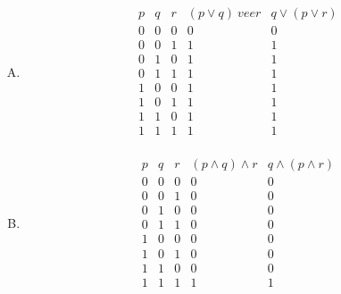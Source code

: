 {{        %
        \begin{practices}
            \begin{enumerate}[A.]
                \item
                {
                    \begin{table}[H]
                        \[
                            \begin{array}{c|c|c|c|c}
                                \hline
                                p & q & r & (p \vee q) \ vee r & q \vee (p \vee r) \\
                                \hline
                                0 & 0 & 0 & 0 & 0 \\
                                0 & 0 & 1 & 1 & 1 \\
                                0 & 1 & 0 & 1 & 1 \\
                                0 & 1 & 1 & 1 & 1 \\
                                1 & 0 & 0 & 1 & 1 \\
                                1 & 0 & 1 & 1 & 1 \\
                                1 & 1 & 0 & 1 & 1 \\
                                1 & 1 & 1 & 1 & 1 \\
                            \end{array}
                        \]
                    \end{table}
                }
                \item
                {
                    \begin{table}[H]
                        \[
                            \begin{array}{c|c|c|c|c}
                                \hline
                                p & q & r & (p \wedge q) \wedge r & q \wedge (p \wedge r) \\
                                \hline
                                0 & 0 & 0 & 0 & 0 \\
                                0 & 0 & 1 & 0 & 0 \\
                                0 & 1 & 0 & 0 & 0 \\
                                0 & 1 & 1 & 0 & 0 \\
                                1 & 0 & 0 & 0 & 0 \\
                                1 & 0 & 1 & 0 & 0 \\
                                1 & 1 & 0 & 0 & 0 \\
                                1 & 1 & 1 & 1 & 1 \\
                            \end{array}
                        \]
                    \end{table}
                }
            \end{enumerate}
        \end{practices}

}}

